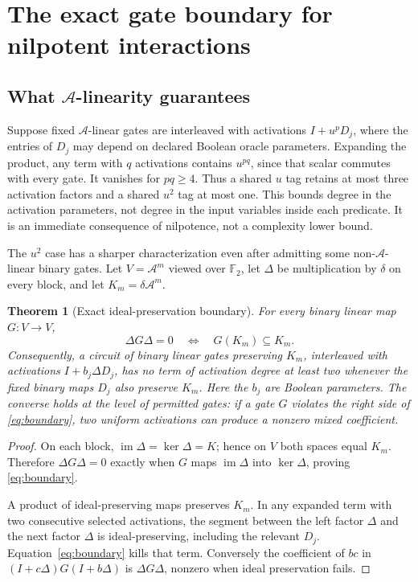 \documentclass[11pt,a4paper]{article}
\newtheorem{theorem}{Theorem}[section]
\theoremstyle{definition}\newtheorem{definition}[theorem]{Definition}
\theoremstyle{remark}\newtheorem{remark}[theorem]{Remark}
\newcommand{\F}{\mathbb F}
\newcommand{\A}{\mathcal A}
\newcommand{\im}{\operatorname{im}}
\numberwithin{equation}{section}
\begin{document}
\section{The exact gate boundary for nilpotent interactions}\label{sec:interaction}
\subsection{What \texorpdfstring{$\A$}{A}-linearity guarantees}
Suppose fixed $\A$-linear gates are interleaved with activations $I+u^pD_j$, where the entries of $D_j$ may depend on declared Boolean oracle parameters. Expanding the product, any term with $q$ activations contains $u^{pq}$, since that scalar commutes with every gate. It vanishes for $pq\ge4$. Thus a shared $u$ tag retains at most three activation factors and a shared $u^2$ tag at most one. This bounds degree in the activation parameters, not degree in the input variables inside each predicate. It is an immediate consequence of nilpotence, not a complexity lower bound.

The $u^2$ case has a sharper characterization even after admitting some non-$\A$-linear binary gates. Let $V=\A^m$ viewed over $\F_2$, let $\Delta$ be multiplication by $\delta$ on every block, and let $K_m=\delta\A^m$.

\begin{theorem}[Exact ideal-preservation boundary]\label{thm:idealboundary}
For every binary linear map $G:V\to V$,
\begin{equation}\label{eq:boundary}
 \Delta G\Delta=0\quad\Longleftrightarrow\quad G(K_m)\subseteq K_m.
\end{equation}
Consequently, a circuit of binary linear gates preserving $K_m$, interleaved with activations $I+b_j\Delta D_j$, has no term of activation degree at least two whenever the fixed binary maps $D_j$ also preserve $K_m$. Here the $b_j$ are Boolean parameters. The converse holds at the level of permitted gates: if a gate $G$ violates the right side of \eqref{eq:boundary}, two uniform activations can produce a nonzero mixed coefficient.
\end{theorem}
\begin{proof}
On each block, $\im\Delta=\ker\Delta=K$; hence on $V$ both spaces equal $K_m$. Therefore $\Delta G\Delta=0$ exactly when $G$ maps $\im\Delta$ into $\ker\Delta$, proving \eqref{eq:boundary}.

A product of ideal-preserving maps preserves $K_m$. In any expanded term with two consecutive selected activations, the segment between the left factor $\Delta$ and the next factor $\Delta$ is ideal-preserving, including the relevant $D_j$. Equation~\eqref{eq:boundary} kills that term. Conversely the coefficient of $bc$ in $(I+c\Delta)G(I+b\Delta)$ is $\Delta G\Delta$, nonzero when ideal preservation fails.
\end{proof}
\end{document}
